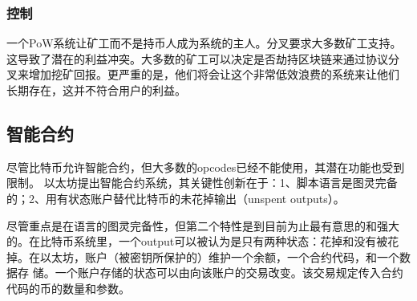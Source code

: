 \documentclass[letterpaper]{article}
\begin{document}
\subsubsection{控制}
一个PoW系统让矿工而不是持币人成为系统的主人。分叉要求大多数矿工支持。
这导致了潜在的利益冲突。大多数的矿工可以决定是否劫持区块链来通过协议分
叉来增加挖矿回报。更严重的是，他们将会让这个非常低效浪费的系统来让他们
长期存在，这并不符合用户的利益。

\subsection{智能合约}
尽管比特币允许智能合约，但大多数的opcodes已经不能使用，其潜在功能也受到限制。
以太坊提出智能合约系统，其关键性创新在于：1、脚本语言是图灵完备的；2、用有状态账户替代比特币的未花掉输出（unspent outputs）。

尽管重点是在语言的图灵完备性，但第二个特性是到目前为止最有意思的和强大
的。在比特币系统里，一个output可以被认为是只有两种状态：花掉和没有被花
掉。在以太坊，账户（被密钥所保护的）维护一个余额，一个合约代码，和一个数据存
储。一个账户存储的状态可以由向该账户的交易改变。该交易规定传入合约代码的币的数量和参数。
\end{document}
